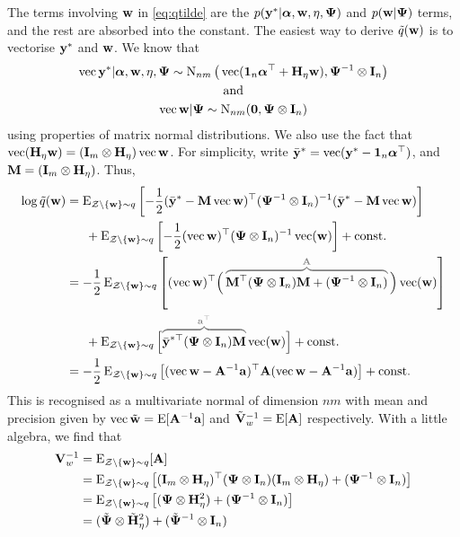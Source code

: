 The terms involving ${\mathbf w}$ in \cref{eq:qtilde} are the $p({\mathbf y}^*|{\bm\alpha},{\mathbf w},\eta,{\bm\Psi})$ and $p({\mathbf w}|{\bm\Psi})$ terms, and the rest are absorbed into the constant.
The easiest way to derive $\tilde q({\mathbf w})$ is to vectorise ${\mathbf y}^*$ and ${\mathbf w}$.
We know that
\begin{gather*}
  \operatorname{vec} {\mathbf y}^* |  {\bm\alpha},{\mathbf w},\eta,{\bm\Psi} \sim \operatorname{N}_{nm}\big(\operatorname{vec} ({\mathbf 1}_n{\bm\alpha}^\top + {\mathbf H}_\eta{\mathbf w}), {\bm\Psi}^{-1}\otimes{\mathbf I}_n\big) \\
  \text{and}\\
  \operatorname{vec} {\mathbf w} | {\bm\Psi} \sim \operatorname{N}_{nm} ({\mathbf 0}, {\bm\Psi}\otimes{\mathbf I}_n)
\end{gather*}
using properties of matrix normal distributions.
We also use the fact that $\operatorname{vec} ({\mathbf H}_\eta{\mathbf w}) = ({\mathbf I}_m \otimes {\mathbf H}_\eta)\operatorname{vec}{\mathbf w}$.  %
For simplicity, write $\bar{{\mathbf y}}^* = \operatorname{vec}({\mathbf y}^* - {\mathbf 1}_n{\bm\alpha}^\top)$, and ${\mathbf M} = ({\mathbf I}_m \otimes {\mathbf H}_\eta)$.
Thus,
\begin{align*}
  \log \tilde q(\bw) 
  &= \E_{\cZ\backslash\{\bw \}\sim q} \left[ 
  -\half (\bar\by^* - \bM\vecc\bw )^\top(\bPsi^{-1} \otimes \bI_n)^{-1} (\bar\by^* - \bM\vecc\bw )
  \right] \\
  &\phantom{==} + \E_{\cZ\backslash\{\bw \}\sim q} \left[ 
  -\half (\vecc \bw )^\top(\bPsi \otimes \bI_n)^{-1} \vecc (\bw ) \right] + \const \\
  &= -\half\E_{\cZ\backslash\{\bw \}\sim q} \left[ 
  (\vecc\bw)^\top \Big( \,
  \greyoverbrace{\bM^\top(\bPsi \otimes \bI_n)\bM + (\bPsi^{-1} \otimes \bI_n)}{\bA} 
  \, \Big) \vecc (\bw )
  \right] \\
  &\phantom{==} + \E_{\cZ\backslash\{\bw \}\sim q} \Big[ 
  \greyoverbrace{\bar\by^{*\top} (\bPsi \otimes \bI_n) \bM}{\ba^\top} \vecc (\bw )
  \Big] + \const \\
  &= -\half\E_{\cZ\backslash\{\bw \}\sim q} \left[
  (\vecc\bw - \bA^{-1}\ba)^\top \bA (\vecc\bw - \bA^{-1}\ba)
  \right] + \const
\end{align*}
This is recognised as a multivariate normal of dimension $nm$ with mean and precision given by $\operatorname{vec} \tilde{{\mathbf w}} = \operatorname{E}[{\mathbf A}^{-1}{\mathbf a}]$ and $\tilde{{\mathbf V}}_w ^{-1}= \operatorname{E}[{\mathbf A}]$ respectively.
With a little algebra, we find that
\begin{align*}
  {\mathbf V}_w^{-1} 
  &= \operatorname{E}_{{\mathcal Z}\backslash\{{\mathbf w} \}\sim q} [{\mathbf A}] \\
  &= \operatorname{E}_{{\mathcal Z}\backslash\{{\mathbf w} \}\sim q} \left[({\mathbf I}_m \otimes {\mathbf H}_\eta)^\top({\bm\Psi} \otimes {\mathbf I}_n)({\mathbf I}_m \otimes {\mathbf H}_\eta) + ({\bm\Psi}^{-1} \otimes {\mathbf I}_n) \right] \\
  &= \operatorname{E}_{{\mathcal Z}\backslash\{{\mathbf w} \}\sim q} \left[({\bm\Psi} \otimes {\mathbf H}_\eta^2) + ({\bm\Psi}^{-1} \otimes {\mathbf I}_n) \right] \\
  &= (\tilde{{\bm\Psi}} \otimes \tilde{{\mathbf H}}_\eta^2) + (\tilde{{\bm\Psi}}^{-1} \otimes {\mathbf I}_n) 
\end{align*}
